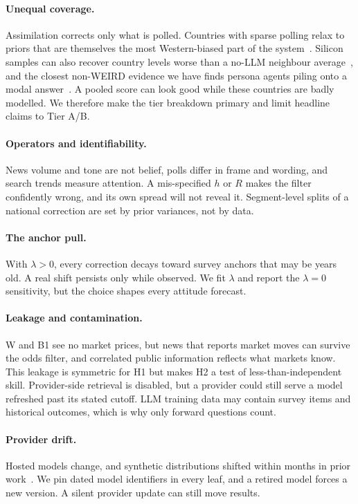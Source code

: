 \documentclass[11pt]{article}
\begin{document}
\paragraph{Unequal coverage.} Assimilation corrects only what is polled. Countries with sparse polling relax to priors that are themselves the most Western-biased part of the system~\citep{durmus2023global,tao2024cultural,wang2026silicon}. Silicon samples can also recover country levels worse than a no-LLM neighbour average~\citep{wang2026silicon}, and the closest non-WEIRD evidence we have finds persona agents piling onto a modal answer~\citep{ozkan2026distribution}. A pooled score can look good while these countries are badly modelled. We therefore make the tier breakdown primary and limit headline claims to Tier A/B.

\paragraph{Operators and identifiability.} News volume and tone are not belief, polls differ in frame and wording, and search trends measure attention. A mis-specified $h$ or $R$ makes the filter confidently wrong, and its own spread will not reveal it. Segment-level splits of a national correction are set by prior variances, not by data.

\paragraph{The anchor pull.} With $\lambda>0$, every correction decays toward survey anchors that may be years old. A real shift persists only while observed. We fit $\lambda$ and report the $\lambda=0$ sensitivity, but the choice shapes every attitude forecast.

\paragraph{Leakage and contamination.} W and B1 see no market prices, but news that reports market moves can survive the odds filter, and correlated public information reflects what markets know. This leakage is symmetric for H1 but makes H2 a test of less-than-independent skill. Provider-side retrieval is disabled, but a provider could still serve a model refreshed past its stated cutoff. LLM training data may contain survey items and historical outcomes, which is why only forward questions count.

\paragraph{Provider drift.} Hosted models change, and synthetic distributions shifted within months in prior work~\citep{bisbee2024synthetic}. We pin dated model identifiers in every leaf, and a retired model forces a new version. A silent provider update can still move results.
\end{document}
